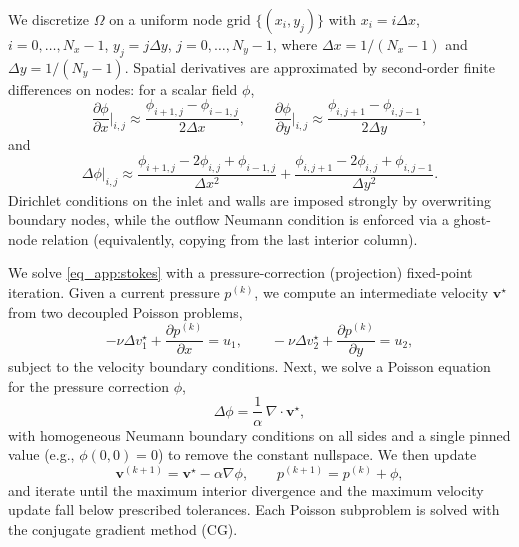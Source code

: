 \documentclass[final,1p,times]{elsarticle}
\theoremstyle{plain} %
\theoremstyle{definition} %
\theoremstyle{remark} %
\begin{document}
We discretize $\Omega$ on a uniform node grid $\{(x_i,y_j)\}$ with
$x_i = i\Delta x$, $i=0,\dots,N_x-1$, $y_j=j\Delta y$, $j=0,\dots,N_y-1$, where
$\Delta x=1/(N_x-1)$ and $\Delta y=1/(N_y-1)$. Spatial derivatives are approximated by second-order
finite differences on nodes: for a scalar field $\phi$,
\begin{equation}\label{eq_app:stokes_fd_ops}
\frac{\partial \phi}{\partial x}\Big|_{i,j} \approx \frac{\phi_{i+1,j}-\phi_{i-1,j}}{2\Delta x},
\qquad
\frac{\partial \phi}{\partial y}\Big|_{i,j} \approx \frac{\phi_{i,j+1}-\phi_{i,j-1}}{2\Delta y},
\end{equation}
and
\begin{equation}\label{eq_app:stokes_fd_lap}
\Delta \phi\Big|_{i,j} \approx
\frac{\phi_{i+1,j}-2\phi_{i,j}+\phi_{i-1,j}}{\Delta x^2}
+\frac{\phi_{i,j+1}-2\phi_{i,j}+\phi_{i,j-1}}{\Delta y^2}.
\end{equation}
Dirichlet conditions on the inlet and walls are imposed strongly by overwriting boundary nodes, while the outflow Neumann condition is enforced via a ghost-node relation (equivalently, copying from the last interior column).

We solve \eqref{eq_app:stokes} with a pressure-correction (projection) fixed-point iteration. Given a
current pressure $p^{(k)}$, we compute an intermediate velocity $\mathbf{v}^\star$ from two decoupled
Poisson problems,
\begin{equation}\label{eq_app:stokes_momentum_disc}
-\nu \Delta v_1^\star + \frac{\partial p^{(k)}}{\partial x} = u_1,
\qquad
-\nu \Delta v_2^\star + \frac{\partial p^{(k)}}{\partial y} = u_2,
\end{equation}
subject to the velocity boundary conditions. Next, we solve a Poisson equation for the pressure
correction $\phi$,
\begin{equation}\label{eq_app:stokes_phi}
\Delta \phi = \frac{1}{\alpha}\,\nabla\cdot \mathbf{v}^\star,
\end{equation}
with homogeneous Neumann boundary conditions on all sides and a single pinned value (e.g.,
$\phi(0,0)=0$) to remove the constant nullspace. We then update
\begin{equation}\label{eq_app:stokes_correction}
\mathbf{v}^{(k+1)} = \mathbf{v}^\star - \alpha \nabla \phi,
\qquad
p^{(k+1)} = p^{(k)} + \phi,
\end{equation}
and iterate until the maximum interior divergence and the maximum velocity update fall below
prescribed tolerances. Each Poisson subproblem is solved with the conjugate gradient method (CG).
\end{document}
